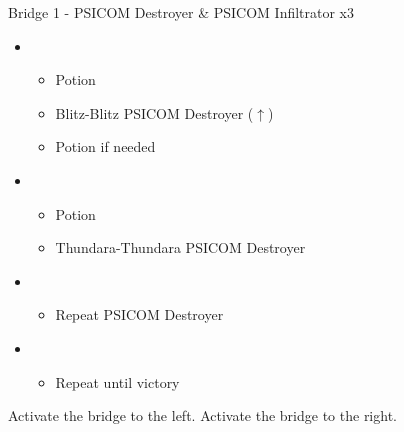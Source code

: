 \begin{multicols}{2}
\begin{battle}{Bridge 1 - PSICOM Destroyer \& PSICOM Infiltrator x3}
\begin{itemize}
    \item \first
    \begin{itemize}
        \item Potion
        \item Blitz-Blitz PSICOM Destroyer ($\uparrow$)
        \item Potion if needed
    \end{itemize}
    \item \fourth
    \begin{itemize}
        \item Potion
        \item Thundara-Thundara PSICOM Destroyer
    \end{itemize}
    \item \first
    \begin{itemize}
        \item Repeat PSICOM Destroyer
    \end{itemize}
    \item \sixth
    \begin{itemize}
        \item Repeat until victory
    \end{itemize}
\end{itemize}
  
\end{battle}
\columnbreak
Activate the bridge to the left.  Activate the bridge to the right.


\end{multicols}
